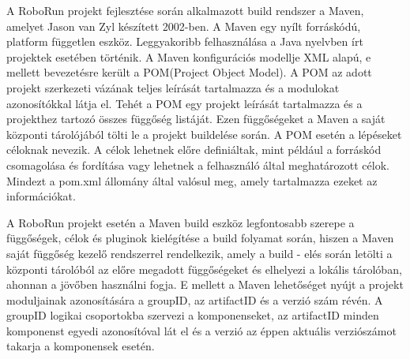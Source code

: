 	A RoboRun projekt fejlesztése során alkalmazott build rendszer a Maven\cite{maven}, amelyet Jason van Zyl készített 2002-ben. A Maven egy nyílt forráskódú, platform független eszköz. Leggyakoribb felhasználása a Java nyelvben írt projektek esetében történik. A Maven konfigurációs modellje XML alapú, e mellett bevezetésre került a POM(Project Object Model). A POM az adott projekt szerkezeti vázának teljes leírását tartalmazza és a modulokat azonosítókkal látja el. Tehét a POM egy projekt leírását tartalmazza és a projekthez tartozó összes függőség listáját. Ezen függőségeket a Maven a saját központi tárolójából tölti le a projekt buildelése során. A POM esetén a lépéseket céloknak nevezik. A célok lehetnek előre definiáltak, mint például a forráskód csomagolása és fordítása vagy lehetnek a felhasználó által meghatározott célok.  Mindezt a pom.xml állomány által valósul meg, amely tartalmazza ezeket az információkat. 
	
	A RoboRun projekt esetén a Maven build eszköz legfontosabb szerepe a függőségek, célok és pluginok kielégítése a build folyamat során, hiszen a Maven saját függőség kezelő rendszerrel rendelkezik, amely  a build - elés során letölti a központi tárolóból az előre megadott függőségeket és elhelyezi a lokális tárolóban, ahonnan a jövőben használni fogja. E mellett a Maven lehetőséget nyújt a projekt moduljainak azonosítására a groupID, az artifactID és a verzió szám révén. A groupID logikai csoportokba szervezi a komponenseket, az artifactID minden komponenst egyedi azonosítóval lát el és a verzió az éppen aktuális verziószámot takarja a komponensek esetén.

